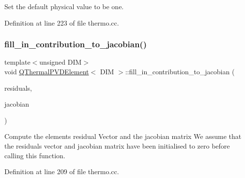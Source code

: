Set the default physical value to be one. 



Definition at line 223 of file thermo.\+cc.

\mbox{\label{classQThermalPVDElement_a6fe89466bee5ebcf16a14a68550ff447}} 
\subsubsection{\texorpdfstring{fill\+\_\+in\+\_\+contribution\+\_\+to\+\_\+jacobian()}{fill\_in\_contribution\_to\_jacobian()}}
{\footnotesize\ttfamily template$<$unsigned D\+IM$>$ \\
void \hyperlink{classQThermalPVDElement}{Q\+Thermal\+P\+V\+D\+Element}$<$ D\+IM $>$\+::fill\+\_\+in\+\_\+contribution\+\_\+to\+\_\+jacobian (\begin{DoxyParamCaption}\item[{Vector$<$ double $>$ \&}]{residuals,  }\item[{Dense\+Matrix$<$ double $>$ \&}]{jacobian }\end{DoxyParamCaption})\hspace{0.3cm}{\ttfamily [inline]}}



Compute the element\textquotesingle{}s residual Vector and the jacobian matrix We assume that the residuals vector and jacobian matrix have been initialised to zero before calling this function. 



Definition at line 209 of file thermo.\+cc.

\mbox{\label{classQThermalPVDElement_ab26361e4164834860ec74603276b0207}} 
